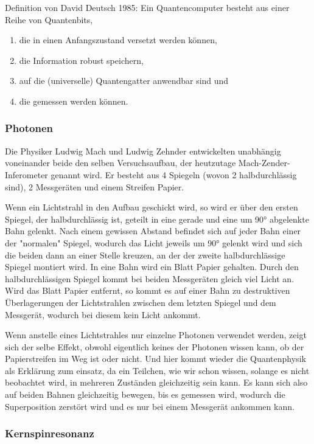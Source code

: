Definition von David Deutsch 1985:
Ein Quantencomputer besteht aus einer Reihe von Quantenbits,
\begin{enumerate}
	\item die in einen Anfangszustand versetzt werden können,
	\item die Information robust speichern,
	\item auf die (universelle) Quantengatter anwendbar sind und
	\item die gemessen werden können.
\end{enumerate}

\subsubsection{Photonen}
\label{sec:Photonen}

Die Physiker Ludwig Mach und Ludwig Zehnder entwickelten unabhängig voneinander beide den selben Versuchsaufbau, der heutzutage Mach-Zender-Inferometer genannt wird. Er besteht aus 4 Spiegeln (wovon 2 halbdurchlässig sind), 2 Messgeräten und einem Streifen Papier.

Wenn ein Lichtstrahl in den Aufbau geschickt wird, so wird er über den ersten Spiegel, der halbdurchlässig ist, geteilt in eine gerade und eine um 90° abgelenkte Bahn gelenkt. Nach einem gewissen Abstand befindet sich auf jeder Bahn einer der "normalen" Spiegel, wodurch das Licht jeweils um 90° gelenkt wird und sich die beiden dann an einer Stelle kreuzen, an der der zweite halbdurchlässige Spiegel montiert wird. In eine Bahn wird ein Blatt Papier gehalten. Durch den halbdurchlässigen Spiegel kommt bei beiden Messgeräten gleich viel Licht an. Wird das Blatt Papier entfernt, so kommt es auf einer Bahn zu destruktiven Überlagerungen der Lichtstrahlen zwischen dem letzten Spiegel und dem Messgerät, wodurch bei diesem kein Licht ankommt.

Wenn anstelle eines Lichtstrahles nur einzelne Photonen verwendet werden, zeigt sich der selbe Effekt, obwohl eigentlich keines der Photonen wissen kann, ob der Papierstreifen im Weg ist oder nicht. Und hier kommt wieder die Quantenphysik als Erklärung zum einsatz, da ein Teilchen, wie wir schon wissen, solange es nicht beobachtet wird, in mehreren Zuständen gleichzeitig sein kann. Es kann sich also auf beiden Bahnen gleichzeitig bewegen, bis es gemessen wird, wodurch die Superposition zerstört wird und es nur bei einem Messgerät ankommen kann.


\subsubsection{Kernspinresonanz}
\label{sec:Kernspinresonanz}

